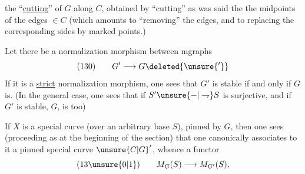 the ``\uline{cutting}'' of $G$ along $C$, obtained by ``cutting'' as was said the the midpoints of the edges $\in C$ (which amounts to ``removing'' the edges, and to replacing the corresponding sides by marked points.)

Let there be a normalization morphism between mgraphs
\[
(130)\qquad G'\longrightarrow G\deleted{\unsure{'}}
\]
If it is a \uline{strict} normalization morphism, one sees that $G'$ is stable if and only if $G$ is. (In the general case, one sees that if $S'\unsure{-|\rightharpoondown}S$ is surjective, and if $G'$ is stable, $G$, is too)

 If $X$ is a special curve (over an arbitrary base $S$), pinned by $G$, then one sees (proceeding as at the beginning of the section) that one canonically associates to it a pinned special curve $\unsure{C|G}'$, whence a functor
\[
(13\unsure{0|1})\qquad M_G(S)\longrightarrow M_{G'}(S),
\]
